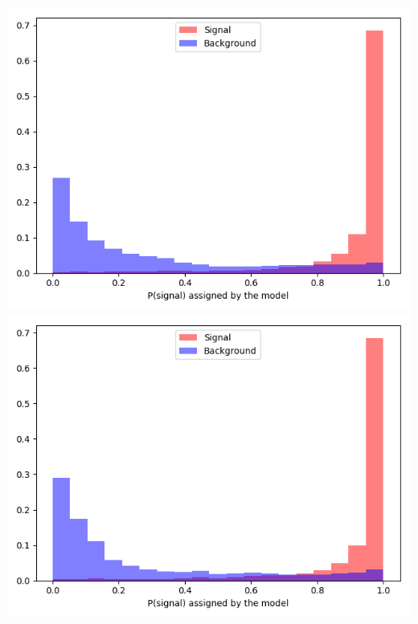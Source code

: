 \documentclass[10pt]{beamer}
\begin{document}
{\begin{columns}
\begin{column}{0.48\textwidth}
\begin{itemize}
\end{itemize}
\includegraphics[width=.85\textwidth]{Images/modelouts/mujetsboth2hidnpart0sigbkg.png} \\
\includegraphics[width=.85\textwidth]{Images/modelouts/mujetsboth2hidnpart1sigbkg.png}
\end{column}
\end{columns}
}
\end{document}
